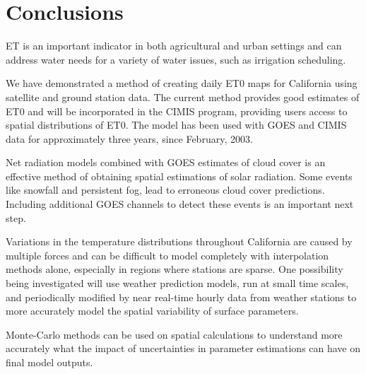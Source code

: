\documentclass[reviewcopy]{elsart}
\begin{document}



\section{Conclusions}

\ac{ET} is an important indicator in both agricultural and urban
settings and can address water needs for a variety of water issues,
such as irrigation scheduling.

We have demonstrated a method of creating daily \ac{ET0} maps
for California using satellite and ground station data.  The current
method provides good estimates of \ac{ET0} and will be incorporated in
the \acl{CIMIS} program, providing users access to spatial
distributions of \ac{ET0}.  The model has been used with \ac{GOES} and
\ac{CIMIS} data for approximately three years, since February, 2003.

Net radiation models combined with \ac{GOES} estimates of cloud cover
is an effective method of obtaining spatial estimations of solar
radiation.  Some events like snowfall and persistent fog, lead to
erroneous cloud cover predictions.  Including additional \ac{GOES}
channels to detect these events is an important next step.

Variations in the temperature distributions throughout California are
caused by multiple forces and can be difficult to model completely
with interpolation methods alone, especially in regions where stations
are sparse.  One possibility being investigated will use weather
prediction models, run at small time scales, and periodically modified
by near real-time hourly data from weather stations to more accurately
model the spatial variability of surface parameters.

Monte-Carlo methods can be used on spatial calculations to understand
more accurately what the impact of uncertainties in parameter
estimations can have on final model outputs.




\end{document}
